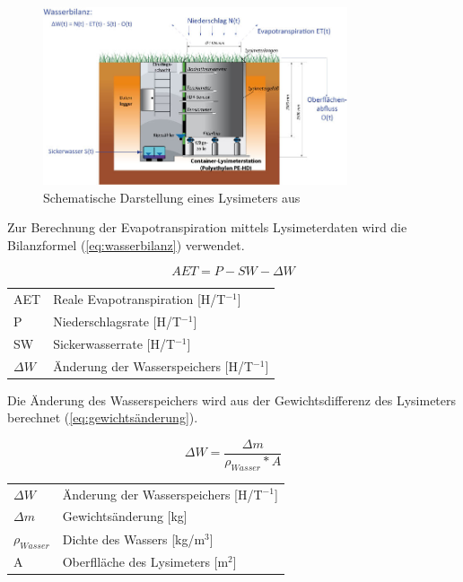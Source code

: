 \begin{figure}[H]
\centering
\includegraphics[width=0.8\textwidth]{figures/lysimeter_schema.jpg}
\caption{Schematische Darstellung eines Lysimeters aus \cite{ugt}}
\label{fig:lysimeter_schema}
\end{figure}


Zur Berechnung der Evapotranspiration mittels Lysimeterdaten wird die Bilanzformel (\ref{eq:wasserbilanz}) verwendet.


\begin{equation}
\label{eq:wasserbilanz}
AET=P-SW-\Delta W
\end{equation}
\begin{table}[H]
\centering
\begin{tabular}{ll}
AET& Reale Evapotranspiration [H/T$^{-1}$]\\
P& Niederschlagsrate  [H/T$^{-1}$]\\
SW & Sickerwasserrate  [H/T$^{-1}$]\\
$\Delta W$ & Änderung der Wasserspeichers  [H/T$^{-1}$]\\
\end{tabular}
\end{table}


Die Änderung des Wasserspeichers wird aus der Gewichtsdifferenz des Lysimeters berechnet (\ref{eq:gewichtsänderung}).


\begin{equation}
\label{eq:gewichtsänderung}
\Delta W=\frac{\Delta m}{\rho_{Wasser}* A}
\end{equation}
\begin{table}[H]
\centering
\begin{tabular}{ll}
$\Delta W$ & Änderung der Wasserspeichers  [H/T$^{-1}$]\\
$\Delta m$ & Gewichtsänderung [kg]\\
$\rho_{Wasser}$ & Dichte des Wassers [kg/m$^3$]\\
A & Oberflläche des Lysimeters [m$^2$]
\end{tabular}
\end{table}

